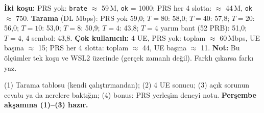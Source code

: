 \documentclass[10.5pt,a4paper]{article}
\begin{document}
\begin{kontrol}
\textbf{İki koşu:} PRS yok: \texttt{brate} $\approx$ 59\,M, \texttt{ok} = 1000; PRS her 4 slotta: $\approx$ 44\,M, \texttt{ok} $\approx$ 750.
\textbf{Tarama} (DL Mbps): PRS yok 59,0; $T=80$: 58,0; $T=40$: 57,8; $T=20$: 56,0; $T=10$: 53,0; $T=8$: 50,9; $T=4$: 43,8; $T=4$ yarım bant (52 PRB): 51,0; $T=4$, 4 sembol: 43,8.
\textbf{Çok kullanıcılı:} 4 UE, PRS yok: toplam $\approx$ 60\,Mbps, UE başına $\approx$ 15; PRS her 4 slotta: toplam $\approx$ 44, UE başına $\approx$ 11.
\textbf{Not:} Bu ölçümler tek koşu ve WSL2 üzerinde (gerçek zamanlı değil). Farklı çıkarsa farkı yaz.
\end{kontrol}

\begin{teslim}
(1) Tarama tablosu (kendi çalıştırmandan); (2) 4 UE sonucu; (3) açık sorunun cevabı ya da nerelere baktığın; (4) bonus: PRS yerleşim deneyi notu. \textbf{Perşembe akşamına (1)--(3) hazır.}
\end{teslim}
\end{document}
